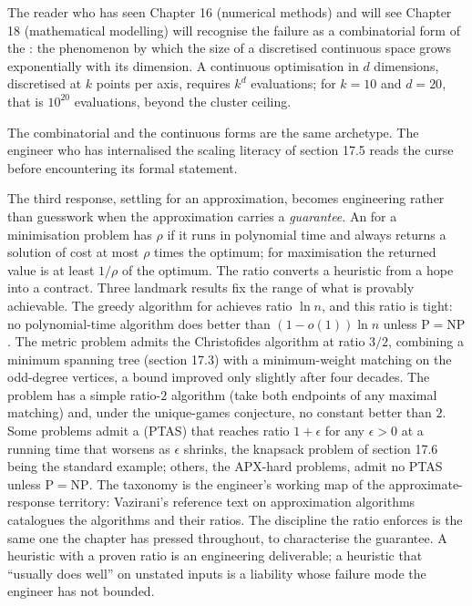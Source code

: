 The reader who has seen Chapter 16 (numerical methods) and will see
Chapter 18 (mathematical modelling) will recognise the failure as a
combinatorial form of the : the
phenomenon by which the size of a discretised continuous space
grows exponentially with its dimension. A continuous optimisation
in $d$ dimensions, discretised at $k$ points per axis, requires
$k^{d}$ evaluations; for $k = 10$ and $d = 20$, that is $10^{20}$
evaluations, beyond the cluster ceiling.

The combinatorial and the continuous forms are the same archetype.
The engineer who has internalised the scaling literacy of section
17.5 reads the curse before encountering its formal statement.

\begin{mastery}
The third response, settling for an approximation, becomes
engineering rather than guesswork when the approximation carries a
\emph{guarantee}. An  for a
minimisation problem has  $\rho$ if it
runs in polynomial time and always returns a solution of cost at most
$\rho$ times the optimum; for maximisation the returned value is at
least $1/\rho$ of the optimum. The ratio converts a heuristic from a
hope into a contract. Three landmark results fix the range of what is
provably achievable. The greedy algorithm for 
achieves ratio $\ln n$, and this ratio is tight: no
polynomial-time algorithm does better than $(1 - o(1)) \ln n$ unless
$\mathrm{P} = \mathrm{NP}$. The metric 
problem admits the Christofides algorithm at ratio $3/2$, combining a
minimum spanning tree (section 17.3) with a minimum-weight matching on
the odd-degree vertices, a bound improved only slightly after four
decades. The  problem has a simple ratio-$2$
algorithm (take both endpoints of any maximal matching) and, under the
unique-games conjecture, no constant better than $2$. Some problems
admit a  (PTAS) that
reaches ratio $1 + \epsilon$ for any $\epsilon > 0$ at a running time
that worsens as $\epsilon$ shrinks, the knapsack problem of section
17.6 being the standard example; others, the APX-hard problems, admit
no PTAS unless $\mathrm{P} = \mathrm{NP}$. The taxonomy is the
engineer's working map of the approximate-response territory: Vazirani's
reference text on approximation algorithms catalogues the algorithms
and their ratios. The discipline the ratio enforces is the same one the
chapter has pressed throughout, to characterise the guarantee. A
heuristic with a proven ratio is an engineering deliverable; a
heuristic that ``usually does well'' on unstated inputs is a liability
whose failure mode the engineer has not bounded.
\end{mastery}

